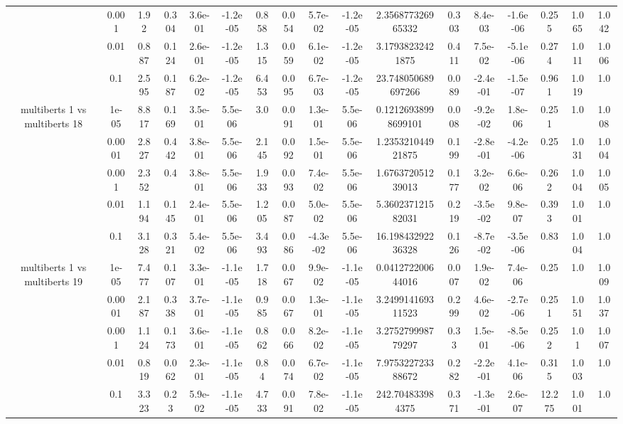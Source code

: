 \begin{tabular}{|c|c|c|c|c|c|c|c|c|c|c|c|c|c|c|c|c|}
 & 0.001 & 1.92 & 0.304 & 3.6e-01 & -1.2e-05 & 0.858 & 0.054 & 5.7e-02 & -1.2e-05 & 2.356877326965332 & 0.303 & 8.4e-03 & -1.6e-06 & 0.255 & 1.065 & 1.042 \\
 & 0.01 & 0.887 & 0.124 & 2.6e-01 & -1.2e-05 & 1.315 & 0.059 & 6.1e-02 & -1.2e-05 & 3.17938232421875 & 0.411 & 7.5e-02 & -5.1e-06 & 0.274 & 1.011 & 1.006 \\
 & 0.1 & 2.595 & 0.187 & 6.2e-02 & -1.2e-05 & 6.453 & 0.095 & 6.7e-03 & -1.2e-05 & 23.748050689697266 & 0.089 & -2.4e-01 & -1.5e-07 & 0.961 & 1.019 & 1.0 \\
\hline
\multirow{5}{*}{multiberts 1 vs multiberts 18} & 1e-05 & 8.817 & 0.169 & 3.5e-01 & 5.5e-06 & 3.0 & 0.091 & 1.3e-01 & 5.5e-06 & 0.12126938998699101 & 0.008 & -9.2e-02 & 1.8e-06 & 0.251 & 1.0 & 1.008 \\
 & 0.0001 & 2.827 & 0.442 & 3.8e-01 & 5.5e-06 & 2.145 & 0.092 & 1.5e-01 & 5.5e-06 & 1.235321044921875 & 0.199 & -2.8e-01 & -4.2e-06 & 0.25 & 1.031 & 1.004 \\
 & 0.001 & 2.352 & 0.4 & 3.8e-01 & 5.5e-06 & 1.933 & 0.093 & 7.4e-02 & 5.5e-06 & 1.676372051239013 & 0.177 & 3.2e-02 & 6.6e-06 & 0.262 & 1.004 & 1.005 \\
 & 0.01 & 1.194 & 0.145 & 2.4e-01 & 5.5e-06 & 1.205 & 0.087 & 5.0e-02 & 5.5e-06 & 5.360237121582031 & 0.219 & -3.5e-02 & 9.8e-07 & 0.393 & 1.001 & 1.0 \\
 & 0.1 & 3.128 & 0.321 & 5.4e-02 & 5.5e-06 & 3.493 & 0.086 & -4.3e-02 & 5.5e-06 & 16.19843292236328 & 0.126 & -8.7e-02 & -3.5e-06 & 0.83 & 1.004 & 1.0 \\
\hline
\multirow{5}{*}{multiberts 1 vs multiberts 19} & 1e-05 & 7.477 & 0.107 & 3.3e-01 & -1.1e-05 & 1.718 & 0.067 & 9.9e-02 & -1.1e-05 & 0.041272200644016 & 0.007 & 1.9e-02 & 7.4e-06 & 0.25 & 1.0 & 1.009 \\
 & 0.0001 & 2.187 & 0.338 & 3.7e-01 & -1.1e-05 & 0.985 & 0.067 & 1.3e-01 & -1.1e-05 & 3.249914169311523 & 0.299 & 4.6e-02 & -2.7e-06 & 0.251 & 1.051 & 1.037 \\
 & 0.001 & 1.124 & 0.173 & 3.6e-01 & -1.1e-05 & 0.862 & 0.066 & 8.2e-02 & -1.1e-05 & 3.275279998779297 & 0.33 & 1.5e-01 & -8.5e-06 & 0.252 & 1.01 & 1.007 \\
 & 0.01 & 0.819 & 0.062 & 2.3e-01 & -1.1e-05 & 0.84 & 0.074 & 6.7e-02 & -1.1e-05 & 7.975322723388672 & 0.282 & -2.2e-01 & 4.1e-06 & 0.315 & 1.003 & 1.0 \\
 & 0.1 & 3.323 & 0.23 & 5.9e-02 & -1.1e-05 & 4.733 & 0.091 & 7.8e-02 & -1.1e-05 & 242.704833984375 & 0.371 & -1.3e-01 & 2.6e-07 & 12.275 & 1.001 & 1.0 \\

\end{tabular}
